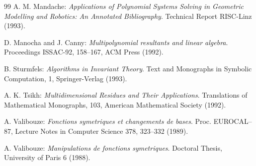 \begin{thebibliography}{99}
\bibitem[M93]{} A. M. Mandache: {\em Applications of Polynomial
Systems Solving in  Geometric  Modelling and Robotics: An Annotated
Bibliography}. Technical Report RISC-Linz (1993).

\bibitem[MC92]{} D. Manocha and J. Canny: {\em Multipolynomial
resultants and linear algebra}. Proceedings ISSAC-92, 158--167, ACM
Press (1992).

\bibitem[S93]{} B. Sturmfels: {\em Algorithms in Invariant Theory}.
Text and Monographs in Symbolic Computation, 1, Springer-Verlag
(1993).

\bibitem[T92]{} A. K. Tsikh: {\em Multidimensional Residues and Their
Applications}. Translations of Mathematical Monographs, 103, American
Mathematical Society (1992). 

\bibitem[V87]{} A. Valibouze: {\em Fonctions symetriques et changements 
de bases}. Proc. EUROCAL--87, Lecture Notes in
Computer Science 378, 323--332 (1989).

\bibitem[V88]{} A. Valibouze: {\em Manipulations de fonctions
symetriques}. Doctoral Thesis, University of Paris 6 (1988). 

\end{thebibliography}


